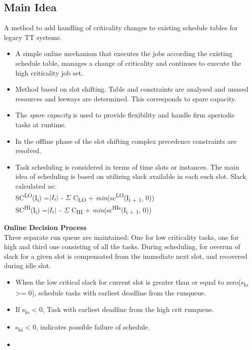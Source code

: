 \subsection*{Main Idea}
A method to add handling of criticality changes to existing schedule tables for legacy TT systems.
\begin{itemize}
	\item A simple online mechanism that executes the jobs according the existing schedule table, manages a change of criticality and continues to execute the high criticality job set.
	\item Method based on slot shifting. Table and constraints are analysed and unused resources and leeways are determined. This corresponds to spare capacity.
	\item The \textit{spare capacity} is used to provide flexibility and handle firm aperiodic tasks at runtime.
	\item In the offline phase of the slot shifting complex precedence constraints are resolved.
	\item Task scheduling is considered in terms of time slots or instances. The main idea of scheduling is based on utilizing slack available in each such slot.
	Slack calculated as:\\
		SC\textsuperscript{LO}(I\textsubscript{i}) =$\arrowvert I_i \arrowvert$ - $\Sigma$ C\textsubscript{LO} + \textit{min}(sc\textsuperscript{LO}(I\textsubscript{i + 1}, 0)) \\
		SC\textsuperscript{HI}(I\textsubscript{i}) =$\arrowvert I_i \arrowvert$ - $\Sigma$ C\textsubscript{HI} + \textit{min}(sc\textsuperscript{HIs}(I\textsubscript{i + 1}, 0))
\end{itemize}
\textbf{Online Decision Process}\\
Three separate run queue are maintained: One for low criticality tasks, one for high and third one consisting of all the tasks.
During scheduling, for overrun of slack for a given slot is compensated from the immediate next slot, and recovered during idle slot.
\begin{itemize}
	\item When the low critical slack for current slot is greater than or equal to zero(s\textsubscript{lo} >= 0), schedule tasks with earliest deadline from the runqueue.
	\item If s\textsubscript{lo} < 0, Task with earliest deadline from the high crit runqueue.
	\item s\textsubscript{hi} < 0, indicates possible failure of schedule.
	\item 
\end{itemize}

